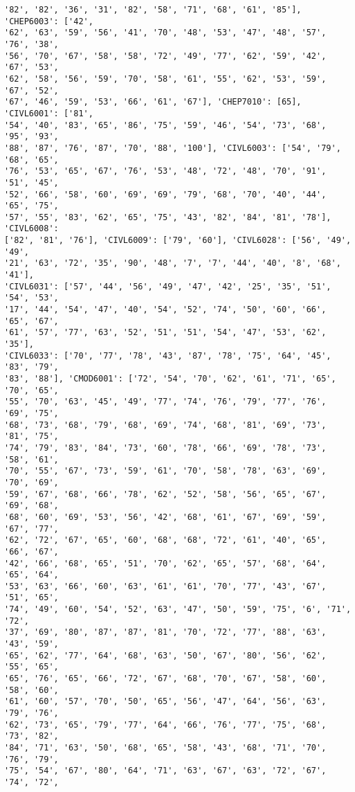 \documentclass[11pt]{article}
\begin{document}
\begin{Verbatim}[commandchars=\\\{\}]
'82', '82', '36', '31', '82', '58', '71', '68', '61', '85'], 'CHEP6003': ['42',
'62', '63', '59', '56', '41', '70', '48', '53', '47', '48', '57', '76', '38',
'56', '70', '67', '58', '58', '72', '49', '77', '62', '59', '42', '67', '53',
'62', '58', '56', '59', '70', '58', '61', '55', '62', '53', '59', '67', '52',
'67', '46', '59', '53', '66', '61', '67'], 'CHEP7010': [65], 'CIVL6001': ['81',
'54', '40', '83', '65', '86', '75', '59', '46', '54', '73', '68', '95', '93',
'88', '87', '76', '87', '70', '88', '100'], 'CIVL6003': ['54', '79', '68', '65',
'76', '53', '65', '67', '76', '53', '48', '72', '48', '70', '91', '51', '45',
'52', '66', '58', '60', '69', '69', '79', '68', '70', '40', '44', '65', '75',
'57', '55', '83', '62', '65', '75', '43', '82', '84', '81', '78'], 'CIVL6008':
['82', '81', '76'], 'CIVL6009': ['79', '60'], 'CIVL6028': ['56', '49', '49',
'21', '63', '72', '35', '90', '48', '7', '7', '44', '40', '8', '68', '41'],
'CIVL6031': ['57', '44', '56', '49', '47', '42', '25', '35', '51', '54', '53',
'17', '44', '54', '47', '40', '54', '52', '74', '50', '60', '66', '65', '67',
'61', '57', '77', '63', '52', '51', '51', '54', '47', '53', '62', '35'],
'CIVL6033': ['70', '77', '78', '43', '87', '78', '75', '64', '45', '83', '79',
'83', '88'], 'CMOD6001': ['72', '54', '70', '62', '61', '71', '65', '70', '65',
'55', '70', '63', '45', '49', '77', '74', '76', '79', '77', '76', '69', '75',
'68', '73', '68', '79', '68', '69', '74', '68', '81', '69', '73', '81', '75',
'74', '79', '83', '84', '73', '60', '78', '66', '69', '78', '73', '58', '61',
'70', '55', '67', '73', '59', '61', '70', '58', '78', '63', '69', '70', '69',
'59', '67', '68', '66', '78', '62', '52', '58', '56', '65', '67', '69', '68',
'68', '60', '69', '53', '56', '42', '68', '61', '67', '69', '59', '67', '77',
'62', '72', '67', '65', '60', '68', '68', '72', '61', '40', '65', '66', '67',
'42', '66', '68', '65', '51', '70', '62', '65', '57', '68', '64', '65', '64',
'53', '63', '66', '60', '63', '61', '61', '70', '77', '43', '67', '51', '65',
'74', '49', '60', '54', '52', '63', '47', '50', '59', '75', '6', '71', '72',
'37', '69', '80', '87', '87', '81', '70', '72', '77', '88', '63', '43', '59',
'65', '62', '77', '64', '68', '63', '50', '67', '80', '56', '62', '55', '65',
'65', '76', '65', '66', '72', '67', '68', '70', '67', '58', '60', '58', '60',
'61', '60', '57', '70', '50', '65', '56', '47', '64', '56', '63', '79', '76',
'62', '73', '65', '79', '77', '64', '66', '76', '77', '75', '68', '73', '82',
'84', '71', '63', '50', '68', '65', '58', '43', '68', '71', '70', '76', '79',
'75', '54', '67', '80', '64', '71', '63', '67', '63', '72', '67', '74', '72',

\end{Verbatim}
\end{document}
